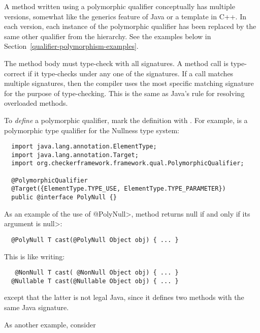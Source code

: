 A method written using a polymorphic qualifier conceptually has multiple
versions, somewhat like the generics feature of Java or a template in C++.
In each version, each instance of the polymorphic qualifier has been
replaced by the same other qualifier from the hierarchy.  See the examples
below in Section~\ref{qualifier-polymorphism-examples}.

The method body must type-check with all signatures.  A method call is
type-correct if it type-checks under any one of the signatures.  If a call
matches multiple signatures, then the compiler uses the most specific
matching signature for the purpose of type-checking.  This is the same as
Java's rule for resolving overloaded methods.

To \emph{define} a polymorphic qualifier, mark the definition with
.  For example,
 is a polymorphic type
qualifier for the Nullness type system:

\begin{Verbatim}
  import java.lang.annotation.ElementType;
  import java.lang.annotation.Target;
  import org.checkerframework.framework.qual.PolymorphicQualifier;

  @PolymorphicQualifier
  @Target({ElementType.TYPE_USE, ElementType.TYPE_PARAMETER})
  public @interface PolyNull {}
\end{Verbatim}



As an example of the use of \<@PolyNull>, method
returns null if and only if its argument is \<null>:

\begin{Verbatim}
  @PolyNull T cast(@PolyNull Object obj) { ... }
\end{Verbatim}

\noindent
This is like writing:

\begin{Verbatim}
   @NonNull T cast( @NonNull Object obj) { ... }
  @Nullable T cast(@Nullable Object obj) { ... }
\end{Verbatim}

\noindent
except that the latter is not legal Java, since it defines two
methods with the same Java signature.


As another example, consider

